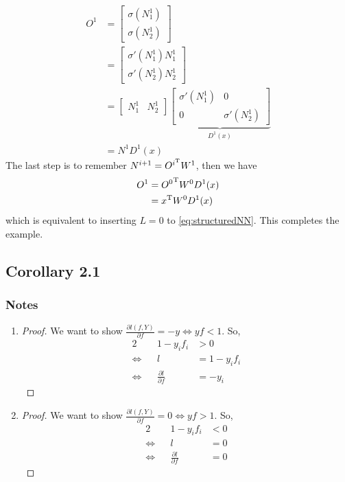 \documentclass[a4paper]{article}
\begin{document}
	\begin{align}
	O^1 &= 
			\begin{bmatrix}
				\sigma(N^1_1) \\
				\sigma(N^1_2)
			\end{bmatrix} \\
		&= 
			\begin{bmatrix}
				\sigma'(N^1_1) N^1_1 \\
				\sigma'(N^1_2) N^1_2
			\end{bmatrix} \\
		&=  
			\begin{bmatrix}
				N^1_1 & N^1_2
			\end{bmatrix}	
			\underbrace{
				\begin{bmatrix}
					\sigma'(N^1_1)	&	0\\
					0				&	\sigma'(N^1_2)
				\end{bmatrix}
			}_{D^1(x)} \\
		&=
			N^1 D^1(x)		
	\end{align}
	The last step is to remember $N^{i+1} = O^{i^{\mathrm{T}}}W^1$, then we have
	\begin{align}
		O^1 &= 
				{O^0}^{\mathrm{T}} W^0 D^1(x) \\
			&= 
				{x}^{\mathrm{T}} W^0 D^1(x)
	\end{align}
	which is equivalent to inserting $L=0$ to \eqref{eq:structuredNN}. This completes the example.
	

\subsection{Corollary 2.1}

\subsubsection{Notes}
\begin{enumerate}
	\item 
	\begin{proof}
		We want to show $\frac{\partial l(f,Y)}{\partial f} = -y \Leftrightarrow yf < 1$. So,
		\begin{alignat*}{2}
			                && 1-y_if_i &> 0 \\
			\Leftrightarrow && l &=1-y_if_i \\
			\Leftrightarrow && \frac{\partial l}{\partial f} &=-y_i
		\end{alignat*}
	  \end{proof}
	\item 
	\begin{proof}
		We want to show $\frac{\partial l(f,Y)}{\partial f} = 0 \Leftrightarrow yf > 1$. So,
		\begin{alignat*}{2}
							&& 1-y_if_i &< 0 \\
			\Leftrightarrow && l &=0 \\
			\Leftrightarrow && \frac{\partial l}{\partial f} &=0
		\end{alignat*}
	  \end{proof}
\end{enumerate}
\end{document}
